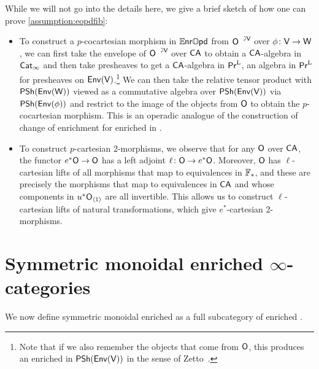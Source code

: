 \documentclass[a4paper,11pt]{article}
\begin{document}
\begin{remark}\label{rmk:assumption sketch}
  While we will not go into the details here, we give a brief sketch
  of how one can prove \cref{assumption:eopdfib}:
  \begin{itemize}
  \item To construct a $p$-cocartesian morphism in $\mathbb{E}\mkern-0.5mu\textsf{\textup{nr}}\mathbb{O}\mkern-0.5mu\textsf{\textup{pd}}$ from
    $\uract{O}{V}$ over
    $\phi \colon \oV \to \oW$, we can first take the envelope of
    $\uract{O}{V}$ over $\textup{\textsf{CA}}$ to obtain a $\textup{\textsf{CA}}$-algebra in $\textup{\textsf{Cat}}_\infty$ and
    then take presheaves to get a $\textup{\textsf{CA}}$-algebra in $\textup{\textsf{Pr}}^{\mathrm{L}}$, \ie{} an
    algebra in $\textup{\textsf{Pr}}^{\mathrm{L}}$ for presheaves on $\textup{\textsf{Env}}(\textup{\textsf{V}})$.\footnote{Note
      that if we also remember the objects that come from $\textup{\textsf{O}}$, this
      produces an \iopd{} enriched in $\textup{\textsf{PSh}}(\textup{\textsf{Env}}(\textup{\textsf{V}}))$ in
      the sense of Zetto~\cite{ZettoOpd}.}
    We can then take the relative tensor product with
    $\textup{\textsf{PSh}}(\textup{\textsf{Env}}(\textup{\textsf{W}}))$ viewed as a commutative algebra over
    $\textup{\textsf{PSh}}(\textup{\textsf{Env}}(\textup{\textsf{V}}))$ via $\textup{\textsf{PSh}}(\textup{\textsf{Env}}(\phi))$ and restrict to the image
    of the objects from $\textup{\textsf{O}}$ to obtain the $p$-cocartesian
    morphism. This is an operadic analogue of the construction of
    change of enrichment for enriched \icats{} in
    \cite{HeineBienr,ReutterZetto}.
  \item To construct $p$-cartesian 2-morphisms, we observe that for
    any \iopd{} $\textup{\textsf{O}}$ over $\textup{\textsf{CA}}$, the functor $e^{*}\oO \to \oO$ has a
    left adjoint $\ell \colon \oO \to e^{*}\oO$. 
    Moreover, $\textup{\textsf{O}}$ has
    $\ell$-cartesian lifts of all morphisms that map to equivalences
    in $\mathbb{F}_{*}$, and these are precisely the morphisms that map to
    equivalences in $\textup{\textsf{CA}}$ and whose components in
    $u^{*}\textup{\textsf{O}}_{\langle 1 \rangle}$ are all invertible. This allows us to
    construct $\ell$-cartesian lifts of natural transformations, which
    give $e^{*}$-cartesian 2-morphisms.
  \end{itemize}
\end{remark}

\section{Symmetric monoidal enriched
  $\infty$-categories}
\label{sec:sm enr conj}

We now define symmetric monoidal enriched \icats{} as a full
subcategory of enriched \iopds{}.
\end{document}
